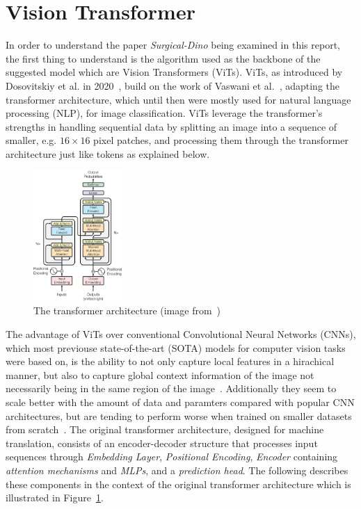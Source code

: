 \section{Vision Transformer}\label{sec:vision-transformer}
In order to understand the paper \emph{Surgical-Dino} being examined in this report, the first thing to understand is the algorithm used as the backbone of the suggested model which are Vision Transformers (ViTs).
ViTs, as introduced by Dosovitskiy et al. in 2020~\cite{Dosovitskiy2020}, build on the work of Vaswani et al.~\cite{Vaswani2017}, adapting the transformer architecture, which until then were mostly used for natural language processing (NLP), for image classification. 
ViTs leverage the transformer's strengths in handling sequential data by splitting an image into a sequence of smaller, e.g. $16\times16$ pixel patches, and processing them through the transformer architecture just like tokens as explained below.
\begin{figure}
    \centering
    \includegraphics[width=0.3\textwidth]{images/TransformerArchitectureVaswani2017TransformerPage3.png}
    \caption[The original transformer architecture]{The transformer architecture (image from~\cite{Vaswani2017})}\label{fig:transformer}
\end{figure}

The advantage of ViTs over conventional Convolutional Neural Networks (CNNs), which most previouse state-of-the-art (SOTA) models for computer vision tasks were based on, is the ability to not only capture local features in a hirachical manner, but also to capture global context information of the image not necessarily being in the same region of the image~\cite{Khan2023}.
Additionally they seem to scale better with the amount of data and paramters compared with popular CNN architectures, but are tending to perform worse when trained on smaller datasets from scratch~\cite{Han2023}.
The original transformer architecture, designed for machine translation, consists of an encoder-decoder structure that processes input sequences through \emph{Embedding Layer}, \emph{Positional Encoding}, \emph{Encoder} containing \emph{attention mechanisms} and \emph{MLPs}, and a \emph{prediction head}. 
The following describes these components in the context of the original transformer architecture which is illustrated in Figure~\ref{fig:transformer}.

